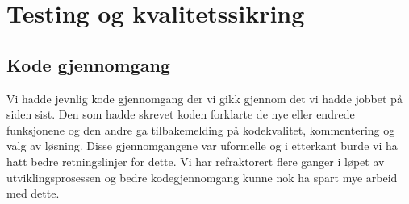 \chapter{Testing og kvalitetssikring}
\label{chap:testing}


\section{Kode gjennomgang}
Vi hadde jevnlig kode gjennomgang der vi gikk gjennom det vi hadde jobbet på siden sist. Den som hadde skrevet koden forklarte de nye eller endrede funksjonene og den andre ga tilbakemelding på kodekvalitet, kommentering og valg av løsning. Disse gjennomgangene var uformelle og i etterkant burde vi ha hatt bedre retningslinjer for dette. Vi har refraktorert flere ganger i løpet av utviklingsprosessen og bedre kodegjennomgang kunne nok ha spart mye arbeid med dette. \\ \\

